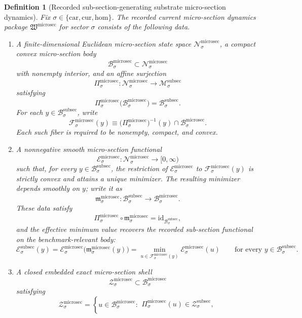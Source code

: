 \documentclass[11pt]{article}
\newcommand{\Car}{\mathrm{car}}
\newcommand{\Cur}{\mathrm{cur}}
\newcommand{\Hom}{\mathrm{hom}}
\newcommand{\SubSectionSpace}[1]{\mathcal M_{#1}^{\mathrm{subsec}}}
\newcommand{\SubSectionBody}[1]{\mathcal B_{#1}^{\mathrm{subsec}}}
\newcommand{\SubSectionFunctional}[1]{\mathscr E_{#1}^{\mathrm{subsec}}}
\newcommand{\SubSectionShell}[1]{\mathcal Z_{#1}^{\mathrm{subsec}}}
\newcommand{\MicroSectionPackage}{\mathfrak W^{\mathrm{microsec}}}
\newcommand{\MicroSectionSpace}[1]{\mathcal N_{#1}^{\mathrm{microsec}}}
\newcommand{\MicroSectionBody}[1]{\mathcal B_{#1}^{\mathrm{microsec}}}
\newcommand{\MicroSectionProj}[1]{\Pi_{#1}^{\mathrm{microsec}}}
\newcommand{\MicroSectionFiber}[2]{\mathcal F_{#1}^{\mathrm{microsec}}(#2)}
\newcommand{\MicroSectionSubMin}[1]{\mathfrak m_{#1}^{\mathrm{microsec}}}
\newcommand{\MicroSectionFunctional}[1]{\mathscr E_{#1}^{\mathrm{microsec}}}
\newcommand{\MicroSectionShell}[1]{\mathcal Z_{#1}^{\mathrm{microsec}}}
\newtheorem{definition}{Definition}
\begin{document}
\begin{definition}[Recorded sub-section-generating substrate micro-section dynamics]
\label{def:microsec}
Fix \(\sigma\in\{\Car,\Cur,\Hom\}\). The recorded current micro-section dynamics package \(\MicroSectionPackage\) for sector \(\sigma\) consists of the following data.
\begin{enumerate}
    \item A finite-dimensional Euclidean micro-section state space \(\MicroSectionSpace{\sigma}\), a compact convex micro-section body
    \[
    \MicroSectionBody{\sigma}\subset\MicroSectionSpace{\sigma}
    \]
    with nonempty interior, and an affine surjection
    \[
    \MicroSectionProj{\sigma}:\MicroSectionSpace{\sigma}\to\SubSectionSpace{\sigma}
    \]
    satisfying
    \[
    \MicroSectionProj{\sigma}\bigl(\MicroSectionBody{\sigma}\bigr)=\SubSectionBody{\sigma}.
    \]
    For each \(y\in\SubSectionBody{\sigma}\), write
    \[
    \MicroSectionFiber{\sigma}{y}
    \equiv
    \bigl(\MicroSectionProj{\sigma}\bigr)^{-1}(y)\cap\MicroSectionBody{\sigma}.
    \]
    Each such fiber is required to be nonempty, compact, and convex.
    \item A nonnegative smooth micro-section functional
    \[
    \MicroSectionFunctional{\sigma}:\MicroSectionSpace{\sigma}\to[0,\infty)
    \]
    such that, for every \(y\in\SubSectionBody{\sigma}\), the restriction of \(\MicroSectionFunctional{\sigma}\) to \(\MicroSectionFiber{\sigma}{y}\) is strictly convex and attains a unique minimizer. The resulting minimizer depends smoothly on \(y\); write it as
    \[
    \MicroSectionSubMin{\sigma}:\SubSectionBody{\sigma}\to\MicroSectionBody{\sigma}.
    \]
    These data satisfy
    \[
    \MicroSectionProj{\sigma}\circ\MicroSectionSubMin{\sigma}
    =
    \mathrm{id}_{\SubSectionBody{\sigma}},
    \]
    and the effective minimum value recovers the recorded sub-section functional on the benchmark-relevant body:
    \[
    \SubSectionFunctional{\sigma}(y)
    =
    \MicroSectionFunctional{\sigma}\bigl(\MicroSectionSubMin{\sigma}(y)\bigr)
    =
    \min_{u\in\MicroSectionFiber{\sigma}{y}}
    \MicroSectionFunctional{\sigma}(u)
    \qquad
    \text{for every }
    y\in\SubSectionBody{\sigma}.
    \]
    \item A closed embedded exact micro-section shell
    \[
    \MicroSectionShell{\sigma}\subset\MicroSectionBody{\sigma}
    \]
    satisfying
    \[
    \MicroSectionShell{\sigma}
    =
    \left\{
    u\in\MicroSectionBody{\sigma}:
    \begin{array}{l}
    \MicroSectionProj{\sigma}(u)\in\SubSectionShell{\sigma},\\[0.2em]

\end{array}\]
\end{enumerate}
\end{definition}
\end{document}
